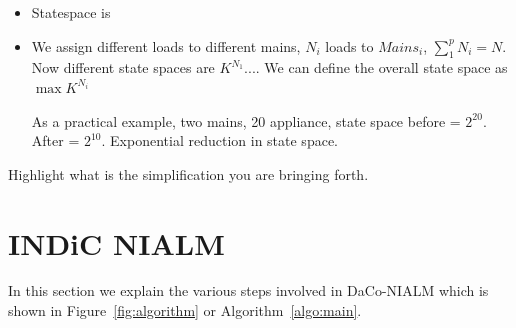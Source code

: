\documentclass[conference]{IEEEtran}
\newcommand{\figref}[1]{Figure~\ref{#1}}
\newcommand{\algoref}[1]{Algorithm~\ref{#1}}
\begin{document}
\begin{itemize}
\item Statespace is 
\item We assign different loads to different mains, $N_i$ loads to $Mains_i$, $\sum\limits_{1}^{p}{N_i}=N$. Now different state spaces are
$K^{N_1}$.... We can define the overall state space as $\max{K^{N_i}}$

As a practical example, two mains, 20 appliance, state space before = $2^{20}$. After = $2^{10}$. Exponential reduction in state space.
\end{itemize}

Highlight what is the simplification you are bringing forth.

\section{INDiC NIALM}
In this section we explain the various steps involved in DaCo-NIALM which is shown in \figref{fig:algorithm} or \algoref{algo:main}.
\end{document}
